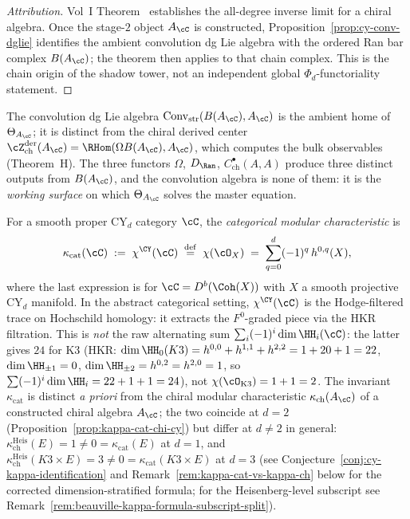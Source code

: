 \begin{proof}[Attribution]
Vol~I Theorem~\cite{VolI} establishes the all-degree
inverse limit for a chiral algebra. Once the stage-$2$ object $A_\cC$ is
constructed, Proposition~\ref{prop:cy-conv-dglie} identifies the ambient
convolution dg Lie algebra with the ordered Ran bar complex
$B(A_\cC)$; the theorem then applies to that chain complex. This is the
chain origin of the shadow tower, not an independent global
$\Phi_d$-functoriality statement.
\end{proof}

\begin{remark}
\label{rem:conv-vs-bulk}
The convolution dg Lie algebra $\mathrm{Conv}_{\mathrm{str}}(B(A_\cC), A_\cC)$ is the ambient home of $\Theta_{A_\cC}$; it is distinct from the chiral derived center $\cZ^{\mathrm{der}}_{\mathrm{ch}}(A_\cC) = \RHom(\Omega B(A_\cC), A_\cC)$, which computes the bulk observables (Theorem~H). The three functors $\Omega$, $D_\Ran$, $C^\bullet_{\mathrm{ch}}(A, A)$ produce three distinct outputs from $B(A_\cC)$, and the convolution algebra is none of them: it is the \emph{working surface} on which $\Theta_{A_\cC}$ solves the master equation.
\end{remark}

\begin{definition}
\label{def:cy-categorical-kappa}
For a smooth proper CY$_d$ category $\cC$, the \emph{categorical modular characteristic} is
\[
 \kappa_{\mathrm{cat}}(\cC) \;:=\; \chi^{\CY}(\cC) \;\stackrel{\mathrm{def}}{=}\; \chi(\cO_X) \;=\; \sum_{q=0}^{d} (-1)^q\, h^{0,q}(X),
\]
where the last expression is for $\cC = D^b(\Coh(X))$ with $X$ a smooth projective CY$_d$ manifold. In the abstract categorical setting, $\chi^{\CY}(\cC)$ is the Hodge-filtered trace on Hochschild homology: it extracts the $F^0$-graded piece via the HKR filtration. This is \emph{not} the raw alternating sum $\sum_i (-1)^i \dim \HH_i(\cC)$: the latter gives $24$ for K3 (HKR: $\dim \HH_0(K3) = h^{0,0} + h^{1,1} + h^{2,2} = 1 + 20 + 1 = 22$, $\dim \HH_{\pm 1} = 0$, $\dim \HH_{\pm 2} = h^{0,2} = h^{2,0} = 1$, so $\sum (-1)^i \dim \HH_i = 22 + 1 + 1 = 24$), not $\chi(\cO_{\mathrm{K3}}) = 1 + 1 = 2$. The invariant $\kappa_{\mathrm{cat}}$ is distinct \emph{a priori} from the chiral modular characteristic $\kappa_{\mathrm{ch}}(A_\cC)$ of a constructed chiral algebra $A_\cC$; the two coincide at $d = 2$ (Proposition~\ref{prop:kappa-cat-chi-cy}) but differ at $d \neq 2$ in general: $\kappa_{\mathrm{ch}}^{\mathrm{Heis}}(E) = 1 \neq 0 = \kappa_{\mathrm{cat}}(E)$ at $d = 1$, and $\kappa_{\mathrm{ch}}^{\mathrm{Heis}}(K3 \times E) = 3 \neq 0 = \kappa_{\mathrm{cat}}(K3 \times E)$ at $d = 3$ (see Conjecture~\ref{conj:cy-kappa-identification} and Remark~\ref{rem:kappa-cat-vs-kappa-ch} below for the corrected dimension-stratified formula; for the Heisenberg-level subscript see Remark~\ref{rem:beauville-kappa-formula-subscript-split}).
\end{definition}

